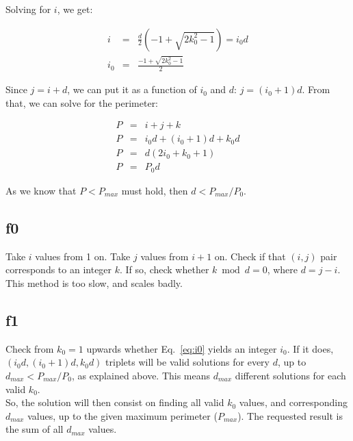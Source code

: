 \documentclass[english]{article}
\begin{document}
Solving for $i$, we get:

\begin{eqnarray}
i & = & \frac{d}{2}(-1 + \sqrt{2k_0^2 - 1}) = i_0 d \\
i_0 & = & \frac{-1 + \sqrt{2k_0^2 - 1}}{2} \label{eq:i0}
\end{eqnarray}

Since $j = i + d$, we can put it as a function of $i_0$ and $d$: $j = (i_0 + 1) d$. From that, we can solve for the perimeter:

\begin{eqnarray}
P & = & i + j + k \\
P & = & i_0 d + (i_0+1)d + k_0 d \\
P & = & d (2 i_0 + k_0 +1) \\
P & = & P_0 d
\end{eqnarray}

As we know that $P < P_{max}$ must hold, then $d < P_{max}/P_0$.

\subsection{f0}

Take $i$ values from 1 on. Take $j$ values from $i+1$ on. Check if that $(i,j)$ pair corresponds to an integer $k$. If so, check whether $k \bmod d = 0$, where $d = j-i$.\\

This method is too slow, and scales badly.

\subsection{f1}

Check from $k_0 = 1$ upwards whether Eq.~\ref{eq:i0} yields an integer $i_0$. If it does, $(i_0 d, (i_0+1)d, k_0 d)$ triplets will be valid solutions for every $d$, up to $d_{max} < P_{max}/P_0$, as explained above. This means $d_{max}$ different solutions for each valid $k_0$.\\

So, the solution will then consist on finding all valid $k_0$ values, and corresponding $d_{max}$ values, up to the given maximum perimeter ($P_{max}$). The requested result is the sum of all $d_{max}$ values.
\end{document}
